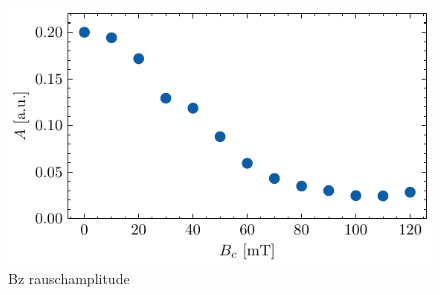 \documentclass[main.tex]{subfiles}
\begin{document}
\begin{figure}[H]
    \centering
    \includegraphics{bilder/plots/max_Bz/rauschamplitude.pdf}
    \caption{Bz rauschamplitude }\label{fig:bz-rauschampl}
\end{figure}


\end{document}
